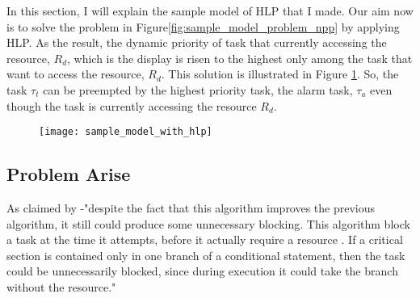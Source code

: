 In this section, I will explain the sample model of HLP that I made. Our aim now is to solve the problem in Figure\ref{fig:sample_model_problem_npp} by applying HLP. As the result, the dynamic priority of task that currently accessing the resource, $ R_{d}$, which is the display is risen to the highest only among the task that want to access the resource, $ R_{d}$. This solution is illustrated in Figure \ref{fig:sample_model_with_hlp}. So, the task $ \tau_{t}$ can be preempted by the highest priority task, the alarm task, $\tau_{a}$ even though the task is currently accessing the resource $ R_{d}$.


\begin{figure}[ht]
    \centering
    \texttt{[image: sample\_model\_with\_hlp]}
    \caption{}
    \label{fig:sample_model_with_hlp}
\end{figure}


\subsection{Problem Arise}

As claimed by \cite{b5} -"despite the fact that this algorithm improves the previous algorithm, it still could produce some unnecessary blocking. This algorithm block a task at the time it attempts, before it actually require a resource \cite{b5}. If a critical section is contained only in one branch of a conditional statement, then the task could be unnecessarily blocked, since during execution it could take the branch without the resource."
 










